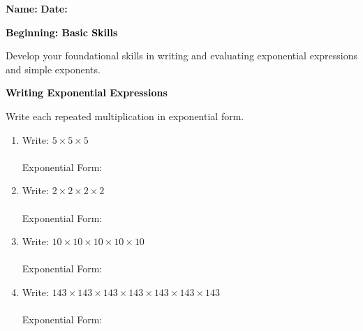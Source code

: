 \documentclass[12pt, letterpaper, fleqn]{article}
\newcommand{\blanklong}{\underline{\hspace{6.5cm}}}
\begin{document}
\textbf{Name:} \underline{\hspace{5cm}}
\hfill
\textbf{Date:} \underline{\hspace{3cm}}\\

\begin{tcolorbox}[colback=black!10]
    \large\textcolor{black}{\textbf{Beginning: Basic Skills}}
\end{tcolorbox}

\vspace{3mm}
\noindent
Develop your foundational skills in writing and evaluating exponential expressions and simple exponents.

\vspace{4mm}

\begin{tcolorbox}[colback=black!10]
\large\textcolor{black}{\textbf{Writing Exponential Expressions}}
\end{tcolorbox}

\noindent
Write each repeated multiplication in exponential form.

\vspace{3mm}

\begin{enumerate}[itemsep=1cm, leftmargin=0.6cm]

\item Write: $5 \times 5 \times 5$ \\ \\
Exponential Form: \blanklong

\vspace{1cm}

\item Write: $2 \times 2 \times 2 \times 2$ \\ \\
Exponential Form: \blanklong

\vspace{1cm}

\item Write: $10 \times 10 \times 10 \times 10 \times 10$ \\ \\
Exponential Form: \blanklong

\vspace{1cm}

\item Write: $143 \times 143 \times 143 \times 143 \times 143 \times 143 \times 143$\\ \\
Exponential Form: \blanklong

\vspace{2cm}

\end{enumerate}
\end{document}
